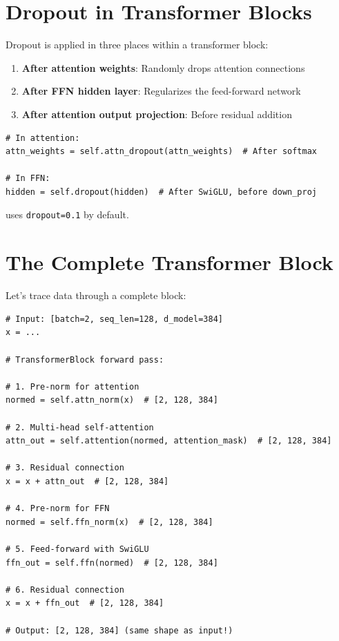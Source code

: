 \section{Dropout in Transformer Blocks}

Dropout is applied in three places within a transformer block:

\begin{enumerate}
    \item \textbf{After attention weights}: Randomly drops attention connections
    \item \textbf{After FFN hidden layer}: Regularizes the feed-forward network
    \item \textbf{After attention output projection}: Before residual addition
\end{enumerate}

\begin{lstlisting}[style=python]
# In attention:
attn_weights = self.attn_dropout(attn_weights)  # After softmax

# In FFN:
hidden = self.dropout(hidden)  # After SwiGLU, before down_proj
\end{lstlisting}

\TryLM uses \texttt{dropout=0.1} by default.

\section{The Complete Transformer Block}

Let's trace data through a complete block:

\begin{lstlisting}[style=python]
# Input: [batch=2, seq_len=128, d_model=384]
x = ...

# TransformerBlock forward pass:

# 1. Pre-norm for attention
normed = self.attn_norm(x)  # [2, 128, 384]

# 2. Multi-head self-attention
attn_out = self.attention(normed, attention_mask)  # [2, 128, 384]

# 3. Residual connection
x = x + attn_out  # [2, 128, 384]

# 4. Pre-norm for FFN
normed = self.ffn_norm(x)  # [2, 128, 384]

# 5. Feed-forward with SwiGLU
ffn_out = self.ffn(normed)  # [2, 128, 384]

# 6. Residual connection
x = x + ffn_out  # [2, 128, 384]

# Output: [2, 128, 384] (same shape as input!)
\end{lstlisting}

